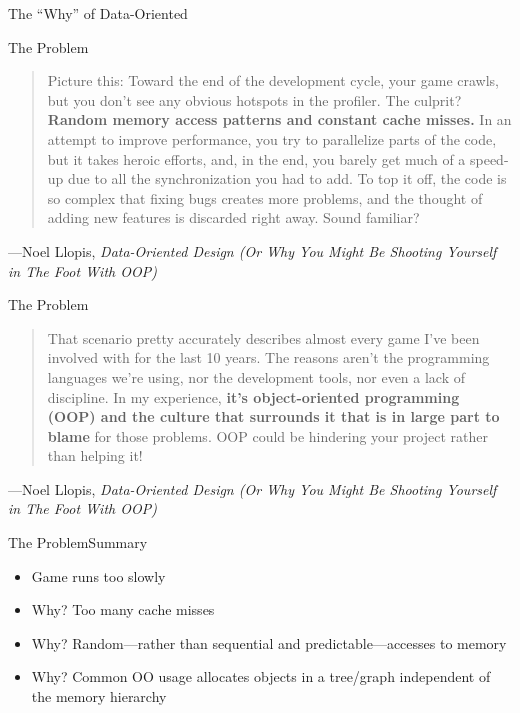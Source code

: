 \documentclass[10pt,xcolor=dvipsnames]{beamer}
\renewcommand\big[1]{
  \begin{center}
    \Large{#1}
  \end{center}
}
\begin{document}
\begin{frame}
  \big{The ``Why'' of Data-Oriented}
\end{frame}

\begin{frame}{The Problem}
  \begin{quote}
    Picture this: Toward the end of the development cycle, your game
    crawls, but you don’t see any obvious hotspots in the profiler.
    The culprit? \textbf{Random memory access patterns and constant
      cache misses.} In an attempt to improve performance, you try to
    parallelize parts of the code, but it takes heroic efforts, and,
    in the end, you barely get much of a speed-up due to all the
    synchronization you had to add. To top it off, the code is so
    complex that fixing bugs creates more problems, and the thought of
    adding new features is discarded right away. Sound familiar?
  \end{quote}

  ---Noel Llopis, \textsl{Data-Oriented Design (Or Why You Might Be Shooting Yourself in The Foot With OOP)}
\end{frame}

\begin{frame}{The Problem}
  \begin{quote}
    That scenario pretty accurately describes almost every game I’ve
    been involved with for the last 10 years. The reasons aren’t the
    programming languages we’re using, nor the development tools, nor
    even a lack of discipline. In my experience, \textbf{it’s object-oriented
    programming (OOP) and the culture that surrounds it that is in
    large part to blame} for those problems. OOP could be hindering
    your project rather than helping it!
  \end{quote}

  ---Noel Llopis, \textsl{Data-Oriented Design (Or Why You Might Be Shooting Yourself in The Foot With OOP)}
\end{frame}

\begin{frame}{The Problem}{Summary}
  \begin{itemize}
    \item Game runs too slowly
    \item Why? Too many cache misses
    \item Why? Random---rather than sequential and predictable---accesses to memory
    \item Why? Common OO usage allocates objects in a tree/graph independent of the memory hierarchy
  \end{itemize}
\end{frame}
\end{document}
